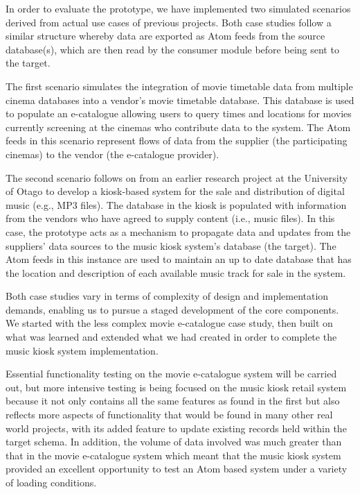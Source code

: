 \documentclass{CRPITStyle}
\begin{document}
In order to evaluate the prototype, we have implemented two simulated
scenarios derived from actual use cases of previous projects. Both case
studies follow a similar structure whereby data are exported as Atom
feeds from the source database(s), which are then read by the consumer
module before being sent to the target.

The first scenario simulates the integration of movie timetable data
from multiple cinema databases into a vendor's movie timetable database.
This database is used to populate an e-catalogue allowing users to query
times and locations for movies currently screening at the cinemas who
contribute data to the system. The Atom feeds in this scenario represent
flows of data from the supplier (the participating cinemas) to the
vendor (the e-catalogue provider).

The second scenario follows on from an earlier research project at the
University of Otago to develop a kiosk-based system for the sale and
distribution of digital music (e.g., MP3 files). The database in the
kiosk is populated with information from the vendors who have agreed to
supply content (i.e., music files). In this case, the prototype acts as
a mechanism to propagate data and updates from the suppliers' data
sources to the music kiosk system's database (the target). The Atom
feeds in this instance are used to maintain an up to date database that
has the location and description of each available music track for sale
in the system.

Both case studies vary in terms of complexity of design and
implementation demands, enabling us to pursue a staged development of
the core components. We started with the less complex movie e-catalogue
case study, then built on what was learned and extended what we had
created in order to complete the music kiosk system implementation.

Essential functionality testing on the movie e-catalogue system will be
carried out, but more intensive testing is being focused on the 
music kiosk retail system because it not only contains all the same 
features as found in the first but also reflects more aspects of 
functionality that would be found in many other real world projects, with
its added feature to update existing records held within the target schema.
In addition, the volume of data involved was much greater than that in the
movie e-catalogue system which meant that the music kiosk system provided
an excellent opportunity to test an Atom based system under a variety of 
loading conditions.
\end{document}

